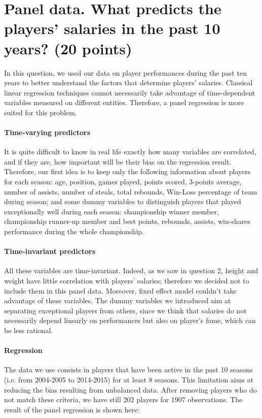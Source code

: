 
\section*{Panel data. What predicts the players' salaries in the past 10 years? (20 points)}
\label{subsec:3Q3}

In this question, we used our data on player performances during the past ten years to better understand the factors that determine players' salaries. Classical linear regression techniques cannot necessarily take advantage of time-dependent variables measured on different entities. Therefore, a panel regression is more suited for this problem.


\paragraph{Time-varying predictors}It is quite difficult to know in real life exactly how many variables are correlated, and if they are, how important will be their bias on the regression result. Therefore, our first idea is to keep only the following information about players for each season: age, position, games played, points scored, 3-points average, number of assists, number of steals, total rebounds, Win-Loss percentage of team during season; and some dummy variables to distinguish players that played exceptionally well during each season: championship winner member, championship runner-up member and best points, rebounds, assists, win-shares performance during the whole championship.

\paragraph{Time-invariant predictors}All these variables are time-invariant. Indeed, as we saw in question 2, height and weight have little correlation with players' salaries; therefore we decided not to include them in this panel data. Moreover, fixed effect model couldn't take advantage of these variables. The dummy variables we introduced aim at separating exceptional players from others, since we think that salaries do not necessarily depend linearly on performances but also on player's fame, which can be less rational.

\paragraph{Regression}The data we use consists in players that have been active in the past 10 seasons (i.e. from 2004-2005 to 2014-2015) for at least 8 seasons. This limitation aims at reducing the bias resulting from unbalanced data. After removing players who do not match these criteria, we have still 202 players for 1907 observations.
The result of the panel regression is shown here:

